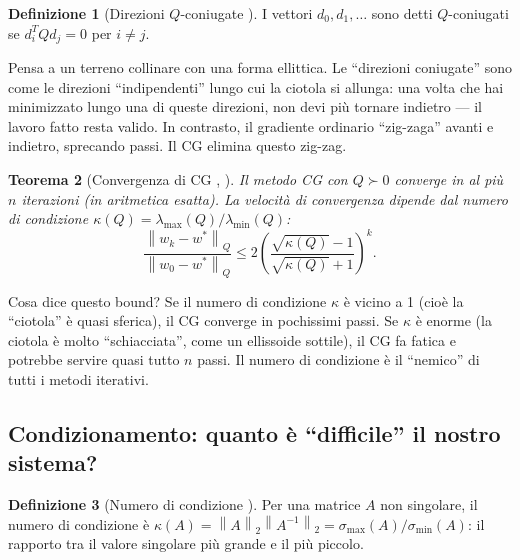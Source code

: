 \documentclass[a4paper,11pt]{article}
\newtheorem{theorem}{Teorema}[section]
\theoremstyle{definition}
\newtheorem{definition}[theorem]{Definizione}
\newcommand{\norm}[1]{\left\lVert #1 \right\rVert}
\begin{document}
\begin{definition}[Direzioni $Q$-coniugate {\cite[Lecture~5]{nla-slides}}]
I vettori $d_0, d_1, \ldots$ sono detti $Q$-coniugati se $d_i^TQd_j = 0$ per $i \neq j$.
\end{definition}

\begin{analogia}
Pensa a un terreno collinare con una forma ellittica. Le ``direzioni coniugate'' sono come le direzioni ``indipendenti'' lungo cui la ciotola si allunga: una volta che hai minimizzato lungo una di queste direzioni, non devi più tornare indietro --- il lavoro fatto resta valido. In contrasto, il gradiente ordinario ``zig-zaga'' avanti e indietro, sprecando passi. Il CG elimina questo zig-zag.
\end{analogia}

\begin{theorem}[Convergenza di CG {\cite[Lecture~5]{nla-slides}, \cite[§1.5]{opt-notes}}]
Il metodo CG con $Q \succ 0$ converge in al più $n$ iterazioni (in aritmetica esatta). La velocità di convergenza dipende dal \emph{numero di condizione} $\kappa(Q) = \lambda_{\max}(Q)/\lambda_{\min}(Q)$:
\[
  \frac{\norm{w_k - w^*}_Q}{\norm{w_0 - w^*}_Q} \leq 2\left(\frac{\sqrt{\kappa(Q)}-1}{\sqrt{\kappa(Q)}+1}\right)^k.
\]
\end{theorem}

\begin{intuizione}
Cosa dice questo bound? Se il numero di condizione $\kappa$ è vicino a 1 (cioè la ``ciotola'' è quasi sferica), il CG converge in pochissimi passi. Se $\kappa$ è enorme (la ciotola è molto ``schiacciata'', come un ellissoide sottile), il CG fa fatica e potrebbe servire quasi tutto $n$ passi. Il numero di condizione è il ``nemico'' di tutti i metodi iterativi.
\end{intuizione}

\subsection{Condizionamento: quanto è ``difficile'' il nostro sistema?}
\label{subsec:conditioning}

\begin{definition}[Numero di condizione {\cite[Lecture~12]{nla-slides}}]
Per una matrice $A$ non singolare, il numero di condizione è $\kappa(A) = \norm{A}_2\norm{A^{-1}}_2 = \sigma_{\max}(A)/\sigma_{\min}(A)$: il rapporto tra il valore singolare più grande e il più piccolo.
\end{definition}
\end{document}
